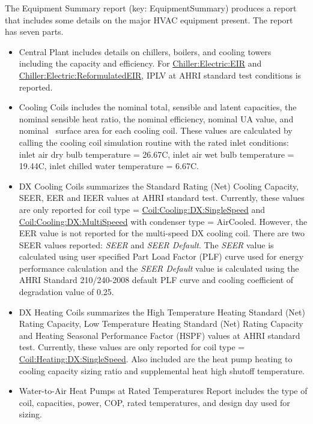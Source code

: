 The Equipment Summary report (key: EquipmentSummary) produces a report that includes some details on the major HVAC equipment present. The report has seven parts.

\begin{itemize}
\item
  Central Plant includes details on chillers, boilers, and cooling towers including the capacity and efficiency. For \hyperref[chillerelectriceir]{Chiller:Electric:EIR} and \hyperref[chillerelectricreformulatedeir]{Chiller:Electric:ReformulatedEIR}, IPLV at AHRI standard test conditions is reported.
\item
  Cooling Coils includes the nominal total, sensible and latent capacities, the nominal sensible heat ratio, the nominal efficiency, nominal UA value, and nominal~ surface area for each cooling coil. These values are calculated by calling the cooling coil simulation routine with the rated inlet conditions: inlet air dry bulb temperature = 26.67C, inlet air wet bulb temperature = 19.44C, inlet chilled water temperature = 6.67C.
\item
  DX Cooling Coils summarizes the Standard Rating (Net) Cooling Capacity, SEER, EER and IEER values at AHRI standard test. Currently, these values are only reported for coil type = \hyperref[coilcoolingdxsinglespeed]{Coil:Cooling:DX:SingleSpeed} and \hyperref[coilcoolingdxmultispeed]{Coil:Cooling:DX:MultiSpeeed} with condenser type = AirCooled. However, the EER value is not reported for the multi-speed DX cooling coil. There are two SEER values reported: \textit{SEER} and \textit{SEER Default}. The \textit{SEER} value is calculated using user specified Part Load Factor (PLF) curve used for energy performance calculation and the \textit{SEER Default} value is calculated using the AHRI Standard 210/240-2008 default PLF curve and cooling coefficient of degradation value of 0.25.
\item
  DX Heating Coils summarizes the High Temperature Heating Standard (Net) Rating Capacity, Low Temperature Heating Standard (Net) Rating Capacity and Heating Seasonal Performance Factor (HSPF) values at AHRI standard test. Currently, these values are only reported for coil type = \hyperref[coilheatingdxsinglespeed]{Coil:Heating:DX:SingleSpeed}. Also included are the heat pump heating to cooling capacity sizing ratio and supplemental heat high shutoff temperature.
\item
  Water-to-Air Heat Pumps at Rated Temperatures Report includes the type of coil, capacities, power, COP, rated temperatures, and design day used for sizing.

\end{itemize}
